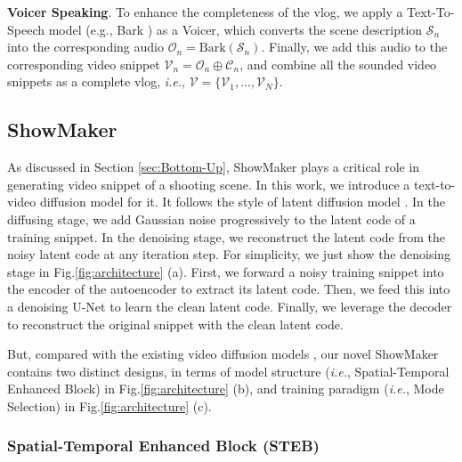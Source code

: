 \textbf{Voicer Speaking}.
To enhance the completeness of the vlog,
we apply a Text-To-Speech model (e.g., Bark \cite{sunoai2023bark}) as a Voicer,
which converts the scene description $\mathcal{S}_{n}$ into the corresponding audio $\mathcal{O}_{n}=\text{Bark}(\mathcal{S}_{n})$.
Finally,
we add this audio to the corresponding video snippet
$\mathcal{V}_{n}=\mathcal{O}_{n}\oplus\mathcal{C}_{n}$,
and
combine all the sounded video snippets as a complete vlog,
\textit{i.e.},
$\mathcal{V}=\{\mathcal{V}_{1},...,\mathcal{V}_{N}\}$.



\subsection{ShowMaker}

As discussed in Section \ref{sec:Bottom-Up},
ShowMaker plays a critical role in generating video snippet of a shooting scene.
In this work,
we introduce a text-to-video diffusion model for it.
It follows the style of latent diffusion model \cite{rombach2022highResolution}.
In the diffusing stage,
we add Gaussian noise progressively to the latent code of a training snippet.
In the denoising stage,
we reconstruct the latent code from the noisy latent code at any iteration step.
For simplicity,
we just show the denoising stage in Fig.\ref{fig:architecture} (a).
First,
we forward a noisy training snippet into the encoder of the autoencoder to extract its latent code.
Then,
we feed this into a denoising U-Net \cite{Ronneberger2015UNetCN} to learn the clean latent code.
Finally,
we leverage the decoder to reconstruct the original snippet with the clean latent code.

But, compared with the existing video diffusion models \cite{Ho2022VideoDM, blattmann2023align, Wang2023LAVIEHV, Ho2022ImagenVH, Ge2023PreserveYO},
our novel ShowMaker contains two distinct designs,
in terms of 
model structure (\textit{i.e.}, Spatial-Temporal Enhanced Block) in  Fig.\ref{fig:architecture} (b),
and
training paradigm (\textit{i.e.}, Mode Selection) in Fig.\ref{fig:architecture} (c).
 

\subsubsection{Spatial-Temporal Enhanced Block (STEB)}
\label{sec:STEB}

